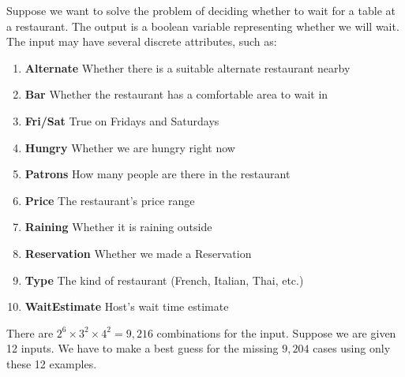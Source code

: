 \documentclass{article}
\begin{document}
Suppose we want to solve the problem of deciding whether
to wait for a table at a restaurant. The output is a boolean
variable representing whether we will wait. The input may have
several discrete attributes, such as:
\begin{enumerate}
    \item \textbf{Alternate} Whether there is a suitable alternate restaurant nearby
    \item \textbf{Bar} Whether the restaurant has a comfortable area to wait in
    \item \textbf{Fri/Sat} True on Fridays and Saturdays
    \item \textbf{Hungry} Whether we are hungry right now
    \item \textbf{Patrons} How many people are there in the restaurant
    \item \textbf{Price} The restaurant's price range
    \item \textbf{Raining} Whether it is raining outside
    \item \textbf{Reservation} Whether we made a Reservation
    \item \textbf{Type} The kind of restaurant (French, Italian, Thai, etc.)
    \item \textbf{WaitEstimate} Host's wait time estimate
\end{enumerate}

There are $2^6 \times 3^2 \times 4^2 = 9,216$ combinations for
the input. Suppose we are given 12 inputs. We have to make a best
guess for the missing $9,204$ cases using only these 12 examples.
\end{document}
